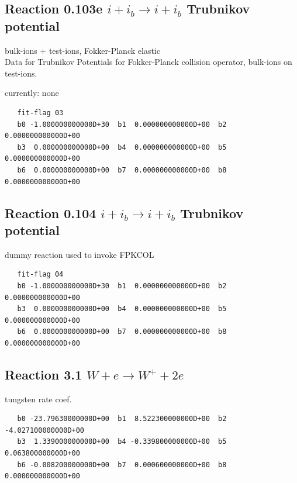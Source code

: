 \documentclass[12pt,dvipdfmx]{article}
\begin{document}
\subsection{
Reaction 0.103e $ i + i_b \rightarrow i + i_b$ Trubnikov potential}
bulk-ions + test-ions, Fokker-Planck elastic \\
Data for Trubnikov Potentials for Fokker-Planck collision
operator, bulk-ions on test-ions.

currently: none

\begin{small}\begin{verbatim}
   fit-flag 03
   b0 -1.000000000000D+30  b1  0.000000000000D+00  b2  0.000000000000D+00
   b3  0.000000000000D+00  b4  0.000000000000D+00  b5  0.000000000000D+00
   b6  0.000000000000D+00  b7  0.000000000000D+00  b8  0.000000000000D+00
\end{verbatim}\end{small}

\subsection{
Reaction 0.104 $ i + i_b \rightarrow i + i_b$ Trubnikov potential}
dummy reaction used to invoke FPKCOL

\begin{small}\begin{verbatim}
   fit-flag 04
   b0 -1.000000000000D+30  b1  0.000000000000D+00  b2  0.000000000000D+00
   b3  0.000000000000D+00  b4  0.000000000000D+00  b5  0.000000000000D+00
   b6  0.000000000000D+00  b7  0.000000000000D+00  b8  0.000000000000D+00
\end{verbatim}\end{small}


\subsection{
Reaction 3.1 $W + e \rightarrow W^+ + 2e $ }
tungsten rate coef.

\begin{small}\begin{verbatim}
   b0 -23.79630000000D+00  b1  8.522300000000D+00  b2 -4.027100000000D+00
   b3  1.339000000000D+00  b4 -0.339800000000D+00  b5  0.063800000000D+00
   b6 -0.008200000000D+00  b7  0.000600000000D+00  b8  0.000000000000D+00
\end{verbatim}\end{small}

\newpage
\end{document}

